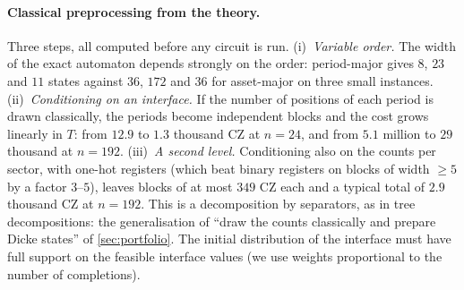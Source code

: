\paragraph{Classical preprocessing from the theory.} Three steps, all computed before any circuit is run. (i)~\emph{Variable order.} The width of the exact automaton depends strongly on the order: period-major gives $8$, $23$ and $11$ states against $36$, $172$ and $36$ for asset-major on three small instances. (ii)~\emph{Conditioning on an interface.} If the number of positions of each period is drawn classically, the periods become independent blocks and the cost grows linearly in $T$: from $12.9$ to $1.3$ thousand CZ at $n=24$, and from $5.1$ million to $29$ thousand at $n=192$. (iii)~\emph{A second level.} Conditioning also on the counts per sector, with one-hot registers (which beat binary registers on blocks of width $\ge5$ by a factor $3$--$5$), leaves blocks of at most $349$ CZ each and a typical total of $2.9$ thousand CZ at $n=192$. This is a decomposition by separators, as in tree decompositions: the generalisation of ``draw the counts classically and prepare Dicke states'' of \cref{sec:portfolio}. The initial distribution of the interface must have full support on the feasible interface values (we use weights proportional to the number of completions).

